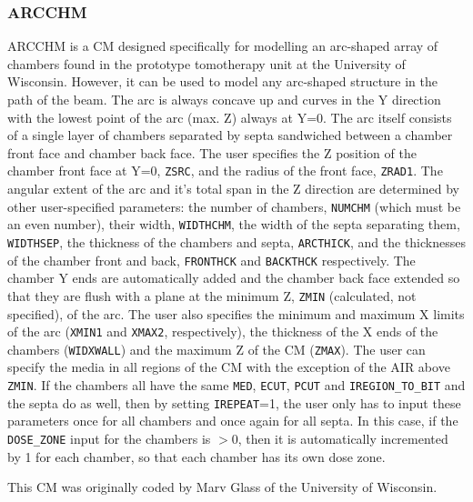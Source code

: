 \documentclass[12pt,twoside]{article}
\begin{document}
\clearpage

\subsubsection{ARCCHM}
\renewcommand{\rightmark}{ARCCHM CM}

ARCCHM is a CM designed specifically for modelling an arc-shaped array of
chambers found in the prototype tomotherapy unit at the University of
Wisconsin.  However, it can be used
to model any arc-shaped structure in the path of the beam.  The arc is
always concave up and curves in the Y direction with the lowest point of the
arc (max. Z) always at Y=0.  The arc itself consists of a single layer of
chambers separated
by septa sandwiched between a chamber front face and chamber back face.  The
user specifies the Z position of the chamber front face at Y=0, {\tt ZSRC},
and the radius of the front face, {\tt ZRAD1}.
The angular extent of the arc
and it's total span in the Z direction are determined by other user-specified
parameters: the number of
chambers, {\tt NUMCHM} (which must be an even number), their width,
{\tt WIDTHCHM}, the width of the septa separating them, {\tt WIDTHSEP}, the
thickness of the chambers and septa, {\tt ARCTHICK}, and the thicknesses of
the chamber front and back, {\tt FRONTHCK} and {\tt BACKTHCK} respectively.
The chamber Y ends are automatically added and the chamber back face extended
so that they are flush with a plane at the minimum Z, {\tt ZMIN} (calculated,
not specified), of the
arc.  The user also specifies the minimum and maximum X limits of the
arc ({\tt XMIN1} and {\tt XMAX2}, respectively), the thickness of the
X ends of the chambers ({\tt WIDXWALL}) and the maximum Z of the CM
({\tt ZMAX}).
The user can specify the media in all regions of the CM with
the exception of the AIR above {\tt ZMIN}.  If the chambers all have
the same {\tt MED}, {\tt ECUT},
{\tt PCUT} and {\tt IREGION\_TO\_BIT} and the septa do as well, then
by setting {\tt IREPEAT}=1, the user only has to input these parameters once
for all chambers and once again for all septa.  In this case, if the {\tt DOSE\_ZONE}
input for the chambers is $>$0, then it is automatically incremented by
1 for each chamber, so that each chamber has its own dose zone.

This CM was originally coded by Marv Glass of the University of
Wisconsin.
\end{document}
